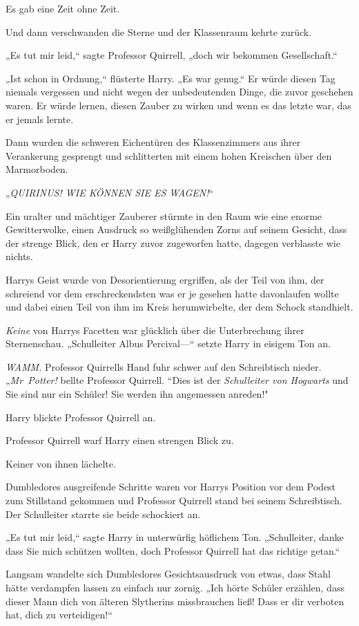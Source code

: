 {Es gab eine Zeit ohne Zeit.

Und dann verschwanden die Sterne und der Klassenraum kehrte zurück.

„Es tut mir leid,“ sagte Professor Quirrell, „doch wir bekommen Gesellschaft.“

„Ist schon in Ordnung,“ flüsterte Harry. „Es war genug.“ Er würde diesen Tag niemals vergessen und nicht wegen der unbedeutenden Dinge, die zuvor geschehen waren. Er würde lernen, diesen Zauber zu wirken und wenn es das letzte war, das er jemals lernte.

Dann wurden die schweren Eichentüren des Klassenzimmers aus ihrer Verankerung gesprengt und schlitterten mit einem hohen Kreischen über den Marmorboden.

„\emph{QUIRINUS! WIE KÖNNEN SIE ES WAGEN!}“

Ein uralter und mächtiger Zauberer stürmte in den Raum wie eine enorme Gewitterwolke, einen Ausdruck so weißglühenden Zorns auf seinem Gesicht, dass der strenge Blick, den er Harry zuvor zugeworfen hatte, dagegen verblasste wie nichts.

Harrys Geist wurde von Desorientierung ergriffen, als der Teil von ihm, der schreiend vor dem erschreckendsten was er je gesehen hatte davonlaufen wollte und dabei einen Teil von ihm im Kreis herumwirbelte, der dem Schock standhielt.

\emph{Keine} von Harrys Facetten war glücklich über die Unterbrechung ihrer Sternenschau. „Schulleiter Albus Percival—“ setzte Harry in eisigem Ton an.

\emph{WAMM.} Professor Quirrells Hand fuhr schwer auf den Schreibtisch nieder. „\emph{Mr~Potter!} bellte Professor Quirrell. “Dies ist der \emph{Schulleiter von Hogwarts} und Sie sind nur ein Schüler! Sie werden ihn angemessen anreden!"

Harry blickte Professor Quirrell an.

Professor Quirrell warf Harry einen strengen Blick zu.

Keiner von ihnen lächelte.

Dumbledores ausgreifende Schritte waren vor Harrys Position vor dem Podest zum Stillstand gekommen und Professor Quirrell stand bei seinem Schreibtisch. Der Schulleiter starrte sie beide schockiert an.

„Es tut mir leid,“ sagte Harry in unterwürfig höflichem Ton. „Schulleiter, danke dass Sie mich schützen wollten, doch Professor Quirrell hat das richtige getan.“

Langsam wandelte sich Dumbledores Gesichtsausdruck von etwas, dass Stahl hätte verdampfen lassen zu einfach nur zornig. „Ich hörte Schüler erzählen, dass dieser Mann dich von älteren Slytherins missbrauchen ließ! Dass er dir verboten hat, dich zu verteidigen!“

}
